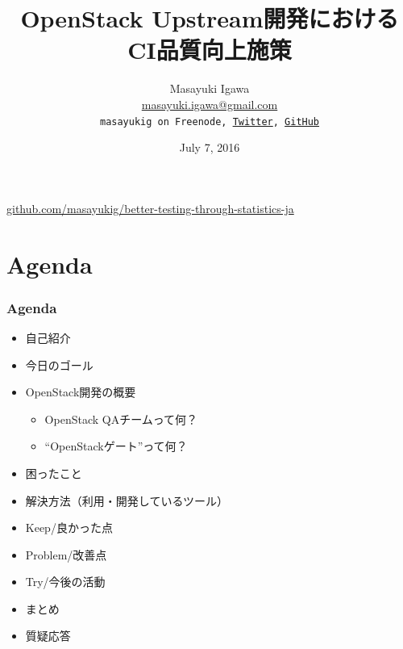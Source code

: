 \documentclass[aspectratio=169,11pt,hyperref={colorlinks=true}]{beamer}
\author[Masayuki Igawa]{%
  \texorpdfstring{%
    \centering
    Masayuki Igawa\\
    \href{mailto:masayuki.igawa@gmail.com}{masayuki.igawa@gmail.com}\\
    \texttt{masayukig on Freenode,
     \href{https://twitter.com/masayukig}{Twitter},
     \href{https://github.com/masayukig}{GitHub}}
  }
  {Masayuki Igawa}
}
\date{July 7, 2016}
\title[OpenStack Upstream開発におけるCI品質向上施策
\hspace{2em}\insertframenumber/\inserttotalframenumber]{OpenStack Upstream開発におけるCI品質向上施策}
\begin{document}


{%
\begin{frame}[noframenumbering]
  \hypersetup{colorlinks,urlcolor=white}
  \titlepage{}
  \centering
  \href{https://github.com/masayukig/better-testing-through-statistics-ja}{github.com/masayukig/better-testing-through-statistics-ja}
\end{frame}
}

\section{Agenda}
\begin{frame}
  \frametitle{Agenda}
  \begin{itemize}
    \item 自己紹介
    \item 今日のゴール
    \item OpenStack開発の概要
    \begin{itemize}
      \item OpenStack QAチームって何？
      \item ``OpenStackゲート''って何？
    \end{itemize}
    \item 困ったこと
    \item 解決方法（利用・開発しているツール）
    \item Keep/良かった点
    \item Problem/改善点
    \item Try/今後の活動
    \item まとめ
    \item 質疑応答
  \end{itemize}
\end{frame}
\end{document}
